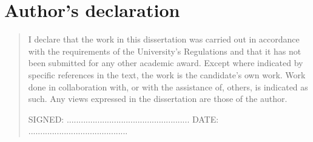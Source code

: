 %
%
\chapter{Author's declaration}
\begin{SingleSpace}
\begin{quote}
I declare that the work in this dissertation was carried out in accordance with the requirements of  the University's Regulations and that it  has not been submitted for any other academic award. Except where indicated by specific references in the text, the work is the candidate's own work. Work done in collaboration with, or with the assistance of, others, is indicated as such. Any views expressed in the dissertation are those of the author.

\vspace{1.5cm}
\noindent
\hspace{-0.75cm}\textsc{SIGNED: .................................................... DATE: ..........................................}
\end{quote}
\end{SingleSpace}
\clearpage